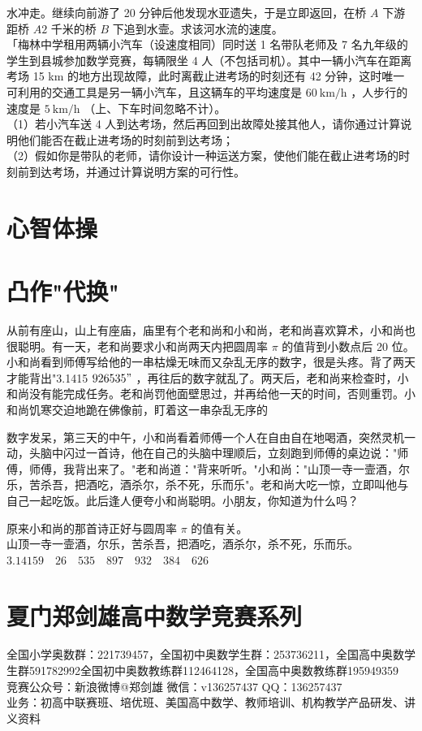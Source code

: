 \documentclass[10pt]{article}
\begin{document}
水冲走。继续向前游了 20 分钟后他发现水亚遗失，于是立即返回，在桥 $A$ 下游距桥 $A 2$ 千米的桥 $B$ 下追到水壸。求该河水流的速度。\\
「梅林中学租用两辆小汽车（设速度相同）同时送 1 名带队老师及 7 名九年级的学生到县城参加数学竞赛，每辆限坐 4 人（不包括司机）。其中一辆小汽车在距离考场 15 km 的地方出现故障，此时离截止进考场的时刻还有 42 分钟，这时唯一可利用的交通工具是另一辆小汽车，且这辆车的平均速度是 $60 \mathrm{~km} / \mathrm{h}$ ，人步行的速度是 $5 \mathrm{~km} / \mathrm{h}$ （上、下车时间忽略不计）。\\
（1）若小汽车送 4 人到达考场，然后再回到出故障处接其他人，请你通过计算说明他们能否在截止进考场的时刻前到达考场；\\
（2）假如你是带队的老师，请你设计一种运送方案，使他们能在截止进考场的时刻前到达考场，并通过计算说明方案的可行性。

\section*{心智体操}
\section*{凸作"代换"}
从前有座山，山上有座庙，庙里有个老和尚和小和尚，老和尚喜欢算术，小和尚也很聪明。有一天，老和尚要求小和尚两天内把圆周率 $\pi$ 的值背到小数点后 20 位。小和尚看到师傅写给他的一串枯燥无味而又杂乱无序的数字，很是头疼。背了两天才能背出"3.1415 $926535 "$ ，再往后的数字就乱了。两天后，老和尚来检查时，小和尚没有能完成任务。老和尚罚他面壁思过，并再给他一天的时间，否则重罚。小和尚饥寒交迫地跪在佛像前，盯着这一串杂乱无序的

数字发呆，第三天的中午，小和尚看着师傅一个人在自由自在地喝酒，突然灵机一动，头脑中闪过一首诗，他在自己的头脑中理顺后，立刻跑到师傅的桌边说："师傅，师傅，我背出来了。"老和尚道："背来听听。"小和尚："山顶一寺一壸酒，尔乐，苦杀吾，把酒吃，酒杀尔，杀不死，乐而乐"。老和尚大吃一惊，立即叫他与自己一起吃饭。此后逢人便夸小和尚聪明。小朋友，你知道为什么吗？

原来小和尚的那首诗正好与圆周率 $\pi$ 的值有关。\\
山顶一寺一壸酒，尔乐，苦杀吾，把酒吃，酒杀尔，杀不死，乐而乐。\\
$3.14159 \quad 26 \quad 535 \quad 897 \quad 932 \quad 384 \quad 626$

\section*{夏门郑剑雄高中数学竞赛系列}
全国小学奥数群：221739457，全国初中奥数学生群：253736211，全国高中奥数学生群591782992全国初中奥数教练群112464128，全国高中奥数教练群195949359\\
竞赛公众号：新浪微博@郑剑雄 微信：v136257437 QQ：136257437\\
业务：初高中联赛班、培优班、美国高中数学、教师培训、机构教学产品研发、讲义资料
\end{document}
